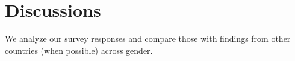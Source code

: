 \section{Discussions}
\label{discussions}
We analyze our survey responses and compare those with findings from other countries (when possible) across gender. %






% 
